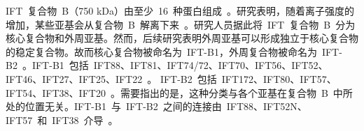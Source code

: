 IFT\ 复合物\ B（750 kDa）由至少\ 16\ 种蛋白组成\ \citep{Morga2013}。研究表明，随着离子强度的增加，某些亚基会从复合物\ B\ 解离下来\ \citep{Behal2013}。研究人员据此将\ IFT\ 复合物\ B\ 分为核心复合物和外周亚基。然而，后续研究表明外周亚基可以形成独立于核心复合物的稳定复合物。故而核心复合物被命名为\ IFT-B1，外周复合物被命名为\ IFT-B2\
\citep{Taschner2016a,Taschner2016}。IFT-B1\ 包括\
IFT88、IFT81、IFT74/72、IFT70、IFT56、IFT52、IFT46、IFT27、IFT25、IFT22\ \citep{Behal2013}。 IFT-B2\ 包括\ IFT172、IFT80、IFT57、IFT54、IFT38、IFT20\ \citep{Taschner2016a}。需要指出的是，这种分类与各个亚基在复合物\ B\ 中所处的位置无关。IFT-B1\ 与\ IFT-B2\ 之间的连接由\ IFT88、IFT52N、IFT57\ 和\ IFT38\ 介导\ \citep{Taschner2016a}。

%
%
%
